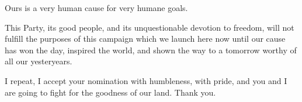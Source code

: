\documentclass{article}
\begin{document}
Ours is a very human cause for very humane goals.

This Party, its good people, and its unquestionable devotion to freedom, will
not fulfill the purposes of this campaign which we launch here now until our
cause has won the day, inspired the world, and shown the way to a tomorrow
worthy of all our yesteryears.

I repeat, I accept your nomination with humbleness, with pride, and you and I
are going to fight for the goodness of our land. Thank you.
\end{document}
